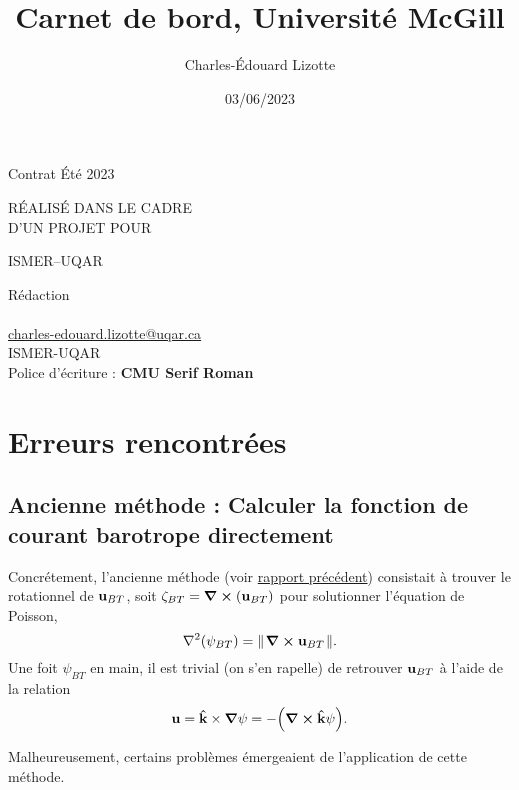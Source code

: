 \documentclass[10pt]{report}
\author{Charles-Édouard Lizotte}
\date{03/06/2023}
\title{Carnet de bord, Université McGill}
\makeatletter
\numberwithin{equation}{section}
\newcommand{\kvf}{\vb{\hat{k}}}
\newcommand{\uu}{\vb{u}}
\newcommand{\pt}{\hspace{1pt}} %
\newcommand{\mytitlepage}{
\begin{titlepage}
\begin{center}
{\Huge Contrat Été 2023 \par}
\vspace{2cm}
{\Huge \MakeUppercase{\thetitle} \par}
\vspace{2cm}
RÉALISÉ DANS LE CADRE\\ D'UN PROJET POUR \par
\vspace{2cm}
{\Huge ISMER--UQAR \par}
\vspace{2cm}
{\thedate}
\end{center}
\vfill
Rédaction \\
{\theauthor}\\
\url{charles-edouard.lizotte@uqar.ca}\\
ISMER-UQAR\\
Police d'écriture : \textbf{CMU Serif Roman}
\end{titlepage}
}
\makeatother
\begin{document}
\mytitlepage
\tableofcontents\newpage

\section{Erreurs rencontrées}
\label{sec:orgf3000b1}

\subsection{Ancienne méthode : Calculer la fonction de courant barotrope directement}
\label{sec:orgffcd703}
Concrétement, l'ancienne méthode (voir \href{rapport-2023-04-28.org}{rapport précédent}) consistait à trouver le rotationnel de \(\uu_{BT}\), soit \(\zeta_{BT} = \curl(\uu_{BT})\) pour solutionner l'équation de Poisson,
\begin{equation}
\label{eq:org5f2318d}
   \laplacian(\psi_{BT}) =  \norm{\pt\curl{\uu_{BT}}\pt}.
\end{equation}
Une foit \(\psi_{BT}\) en main, il est trivial (on s'en rapelle) de retrouver \(\uu_{BT}\) à l'aide de la relation
\begin{equation}
   \uu = \kvf\times\gradient{\psi} = - \qty(\curl{\kvf\psi}).
\end{equation}

Malheureusement, certains problèmes émergeaient de l'application de cette méthode.
\end{document}
